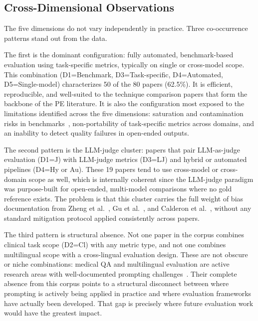 \documentclass[journal]{IEEEtran}
\begin{document}
\subsection{Cross-Dimensional Observations}

The five dimensions do not vary independently in practice. Three
co-occurrence patterns stand out from the data.

The first is the dominant configuration: fully
automated, benchmark-based evaluation using task-specific metrics,
typically on single or cross-model scope.
This combination (D1=Benchmark, D3=Task-specific, D4=Automated,
D5=Single-model) characterizes 50 of the 80 papers (62.5\%). It is
efficient, reproducible, and well-suited to the technique comparison
papers that form the backbone of the PE literature. It is also the configuration
most exposed to the limitations identified across the five dimensions:
saturation and contamination risks in benchmarks~\cite{ni2025benchmarks},
non-portability of task-specific metrics across domains, and an
inability to detect quality failures in open-ended outputs.

The second pattern is the LLM-judge cluster: papers that pair
LLM-as-judge evaluation (D1=J) with LLM-judge metrics (D3=LJ) and
hybrid or automated pipelines (D4=Hy or Au). These 19 papers tend to
use cross-model or cross-domain scope as well, which is internally coherent since the
LLM-judge paradigm was purpose-built for open-ended,
multi-model comparisons where no gold reference exists. The problem
is that this cluster carries the full weight of bias documentation from
Zheng et al.~\cite{zheng2023judging}, Gu et al.~\cite{gu2025llmjudge},
and Calderon et al.~\cite{alternativeannotator2025}, without any
standard mitigation protocol applied consistently across papers.

The third pattern is structural absence. Not one paper in the corpus
combines clinical task scope (D2=Cl) with any metric type, and not
one combines multilingual scope with a cross-lingual evaluation
design. These are not obscure or niche combinations: medical QA and multilingual
evaluation are active research areas with well-documented prompting
challenges~\cite{clinicalnlp2024,vatsal2024survey}. Their complete absence
from this corpus points to a structural disconnect between where
prompting is actively being applied in practice and where evaluation frameworks
have actually been developed. That gap is precisely where future evaluation work would
have the greatest impact.

\end{document}
